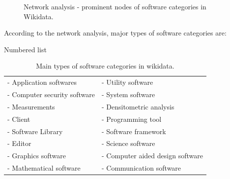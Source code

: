 \begin{figure}[h]
	\myfloatalign
	 \quad
	\caption[Subfloat - Figure]{Network analysis - prominent nodes of software categories in Wikidata.}
	\label{fig:chapter03:subfloat}
\end{figure}

According to the network analysis, major types of software categories are:

Numbered list 

\begin{table}[h!]
	\begin{center}
		\caption{Main types of software categories in wikidata.}
		\label{tab:table1}
		\begin{tabular}{|l|l|} %
			
			\hline
			- Application softwares & -	Utility software  \\
			- Computer security software & - System software \\
			- Measurements   & - Densitometric analysis \\
			- Client       & - Programming tool   \\
			- Software Library        & - Software framework  \\
			- Editor  & - Science software     \\
			- Graphics software     & - Computer aided design software \\
			- Mathematical software          & - Communication software \\
			\hline
		\end{tabular}
	\end{center}
\end{table}

